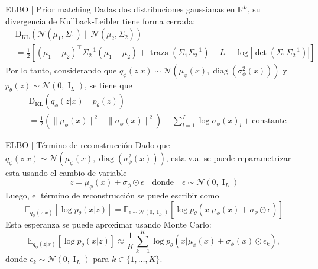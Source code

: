 \documentclass{beamer}
\newcommand{\R}{\mathbb{R}}
\begin{document}
\begin{frame}{ELBO | Prior matching}
    Dadas dos distribuciones gaussianas en $\R^L$, su divergencia de Kullback-Leibler tiene forma cerrada:
    \begin{align*}
         & \operatorname{D_{KL}}\left(\mathcal{N}(\mu_1,\Sigma_1)\|\mathcal{N}(\mu_2,\Sigma_2)\right)                                                               \\
         & = \frac{1}{2}\left[(\mu_1-\mu_2)^\top\Sigma_2^{-1}(\mu_1-\mu_2) + \operatorname{traza}(\Sigma_1\Sigma_2^{-1})-L-\log|\det(\Sigma_1\Sigma_2^{-1})|\right]
    \end{align*}
    Por lo tanto, considerando que $q_\phi(z|x)\sim\mathcal{N}\left(\mu_\phi(x),\operatorname{diag}(\sigma_\phi^2(x))\right)$ y $p_\theta(z)\sim\mathcal{N}(0, \operatorname{I}_L)$, se tiene que
    \begin{align*}
         & \operatorname{{D}_{KL}}\left(q_\phi(z|x)\| p_\theta(z)\right)                                                               \\
         & = \frac{1}{2}\left(\|\mu_\phi(x)\|^2 + \|\sigma_\phi(x)\|^2 \right) - \sum_{l=1}^L \log \sigma_\phi(x)_l + \text{constante}
    \end{align*}
\end{frame}

\begin{frame}{ELBO | Término de reconstrucción}
    Dado que $q_\phi(z|x)\sim\mathcal{N}\left(\mu_\phi(x),\operatorname{diag}(\sigma_\phi^2(x))\right)$, esta v.a. se puede reparametrizar esta usando el cambio de variable
    \begin{equation*}
        z=\mu_\phi(x)+\sigma_\phi\odot \epsilon
        \quad\text{donde}\quad
        \epsilon\sim\mathcal{N}(0,\operatorname{I}_L)
    \end{equation*}
    Luego, el término de reconstrucción se puede escribir como
    \begin{equation*}
        \mathbb{E}_{q_\phi(z|x)}\left[\log p_\theta(x|z)\right] =
        \mathbb{E}_{\epsilon\sim\mathcal{N}(0,\operatorname{I}_L)}\left[\log p_\theta(x|\mu_\phi(x)+\sigma_\phi\odot \epsilon)\right]
    \end{equation*}
    Esta esperanza se puede aproximar usando Monte Carlo:
    \begin{equation*}
        \mathbb{E}_{q_\phi(z|x)}\left[\log p_\theta(x|z)\right] \approx \frac{1}{K} \sum_{k=1}^K \log p_\theta(x|\mu_\phi(x)+\sigma_\phi(x)\odot \epsilon_k),
    \end{equation*}
    donde $\epsilon_k\sim\mathcal{N}(0,\operatorname{I}_L)$ para $k\in\{1,\ldots,K\}$.
\end{frame}
\end{document}
